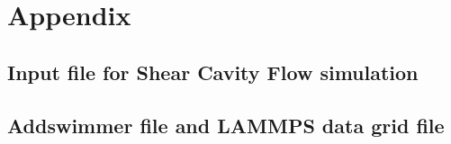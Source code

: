 \chapter{Appendix}
\label{sec:appendix}

\section{Input file for Shear Cavity Flow simulation}
\label{app:NURBSVolumenelement}




\section{Addswimmer file and LAMMPS data grid file}
\label{app:addswimmer}



